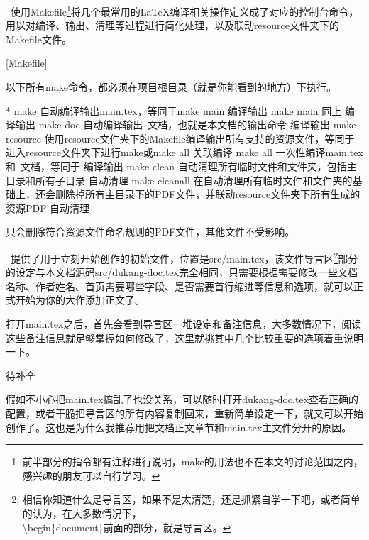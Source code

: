 \dk~使用Makefile\footnote{前半部分的指令都有注释进行说明，make的用法也不在本文的讨论范围之内，感兴趣的朋友可以自行学习。}将几个最常用的{\LaTeX}编译相关操作定义成了对应的控制台命令，用以对编译、输出、清理等过程进行简化处理，以及联动resource文件夹下的Makefile文件。

[Makefile]

\begin{dkcomment}
  以下所有make命令，都必须在项目根目录（就是你能看到的地方）下执行。
\end{dkcomment}

\begin{cvhonors}*
  \cvhonor
  {make}
  {自动编译输出main.tex，等同于make main}
  {编译输出}
  \cvhonor
  {make main}
  {同上}
  {编译输出}
  \cvhonor
  {make doc}
  {自动编译输出\dk~文档，也就是本文档的输出命令}
  {编译输出}
  \cvhonor
  {make resource}
  {使用resource文件夹下的Makefile编译输出所有支持的资源文件，等同于进入resource文件夹下进行make或make all}
  {关联编译}
  \cvhonor
  {make all}
  {一次性编译main.tex和\dk~文档，等同于}
  {编译输出}
  \cvhonor
  {make clean}
  {自动清理所有临时文件和文件夹，包括主目录和所有子目录}
  {自动清理}
  \cvhonor
  {make cleanall}
  {在自动清理所有临时文件和文件夹的基础上，还会删除掉所有主目录下的PDF文件，并联动resource文件夹下所有生成的资源PDF}
  {自动清理}
\end{cvhonors}

\begin{dkcomment}
  只会删除符合资源文件命名规则的PDF文件，其他文件不受影响。
\end{dkcomment}

\dk~提供了用于立刻开始创作的初始文件，位置是src/main.tex，该文件导言区\footnote{相信你知道什么是导言区，如果不是太清楚，还是抓紧自学一下吧，或者简单的认为，在大多数情况下，\\\textbackslash begin\{document\}前面的部分，就是导言区。}部分的设定与本文档源码src/dukang-doc.tex完全相同，只需要根据需要修改一些文档名称、作者姓名、首页需要哪些字段、是否需要首行缩进等信息和选项，就可以正式开始为你的大作添加正文了。

打开main.tex之后，首先会看到导言区一堆设定和备注信息，大多数情况下，阅读这些备注信息就足够掌握如何修改了，这里就挑其中几个比较重要的选项着重说明一下。

待补全

假如不小心把main.tex搞乱了也没关系，可以随时打开dukang-doc.tex查看正确的配置，或者干脆把导言区的所有内容复制回来，重新简单设定一下，就又可以开始创作了。这也是为什么我推荐用把文档正文章节和main.tex主文件分开的原因。

